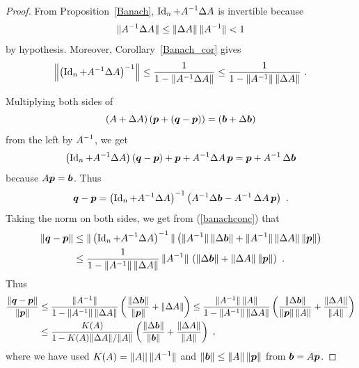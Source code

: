 \begin{proof}
From Proposition~\ref{Banach}, $\displaystyle \operatorname{Id}_n + A^{-1}\Delta{A}$
is invertible because
\[
\|A^{-1}\Delta{A}\| \leq \|\Delta{A}\| \, \|A^{-1}\| < 1
\]
by hypothesis.  Moreover, Corollary~\ref{Banach_cor} gives
\begin{equation}\label{banachconc}
\left\|\left( \operatorname{Id}_n + A^{-1}\Delta{A} \right)^{-1} \right\| \leq
\frac{1}{1 - \|A^{-1}\Delta{A}\|} \leq
\frac{1}{1 - \|A^{-1}\|\,\|\Delta{A}\|} \ .
\end{equation}

Multiplying both sides of
\[
(A+\Delta{A})\left(\bm{p} + (\bm{q}-\bm{p})\right)
= (\bm{b} + \Delta{\bm{b}})
\]
from the left by $\displaystyle A^{-1}$, we get
\[
\left(\operatorname{Id}_n + A^{-1} \Delta{A} \right) \left(\bm{q}-\bm{p}\right)
+\bm{p} + A^{-1}\Delta{A} \, \bm{p} = \bm{p} + A^{-1}\,\Delta{\bm{b}}
\]
because $A\bm{p}=\bm{b}$.  Thus
\[
\VEC{q}-\VEC{p} = \left(\Id_n + A^{-1} \dtx{A} \right)^{-1}
\left( A^{-1} \dtx{\VEC{b}} - A^{-1}\,\dtx{A} \, \VEC{p} \right) \ .
\]
Taking the norm on both sides, we get from (\ref{banachconc}) that
\begin{align*}
\| \bm{q}-\bm{p} \| &\leq \|\left(\operatorname{Id}_n + A^{-1} \Delta{A} \right)^{-1} \|
\left( \|A^{-1}\|\, \|\Delta{\bm{b}}\| +
 \|A^{-1}\|\, \|\Delta{A} \| \, \| \bm{p} \|\right) \\
&\leq \frac{1}{1 - \|A^{-1}\|\, \|\Delta{A}\|}\, \|A^{-1}\|\,
\left( \|\Delta{\bm{b}}\| + \|\Delta{A} \|\, \| \bm{p} \|\right) \ .
\end{align*}
Thus
\begin{align*}
\frac{\| \bm{q}-\bm{p} \|}{\|\bm{p}\|}
&\leq \frac{\|A^{-1}\|}{1 - \|A^{-1}\|\, \|\Delta{A}\|}
\left( \frac{\|\Delta{\bm{b}}\|}{\|\bm{p}\|} + \|\Delta{A} \|\right)
\leq \frac{\|A^{-1}\|\, \|A\|}{1 - \|A^{-1}\|\, \|\Delta{A}\|}
\left( \frac{\|\Delta{\bm{b}}\|}{\|\bm{p}\|\, \|A\|}
+ \frac{\|\Delta{A}\|}{\|A\|} \right) \\
&\leq \frac{K(A)}{1 - K(A) \|\Delta{A}\|/\|A\|}
\left( \frac{\|\Delta{\bm{b}}\|}{\|\bm{b}\|}
+ \frac{\|\Delta{A}\|}{\|A\|} \right) \ ,
\end{align*}
where we have used $\displaystyle K(A) = \|A||\, \|A^{-1}\|$ and
$\|\bm{b}\| \leq \|A\|\, \|\bm{p}\|$ from $\bm{b}=A\bm{p}$.
\end{proof}

